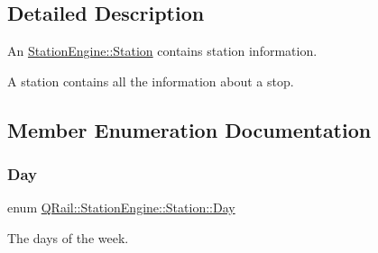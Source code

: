 \subsection{Detailed Description}
An \mbox{\hyperlink{classQRail_1_1StationEngine_1_1Station}{Station\+Engine\+::\+Station}} contains station information. 

A station contains all the information about a stop. 

\subsection{Member Enumeration Documentation}
\mbox{\label{classQRail_1_1StationEngine_1_1Station_ae8c109a1d5ce2bb41959e62e32392631}} 
\subsubsection{\texorpdfstring{Day}{Day}}
{\footnotesize\ttfamily enum \mbox{\hyperlink{classQRail_1_1StationEngine_1_1Station_ae8c109a1d5ce2bb41959e62e32392631}{Q\+Rail\+::\+Station\+Engine\+::\+Station\+::\+Day}}\hspace{0.3cm}{\ttfamily [strong]}}



The days of the week. 


